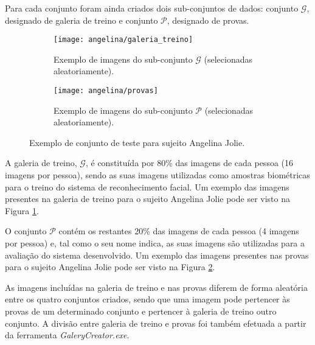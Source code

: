 Para cada conjunto foram ainda criados dois sub-conjuntos de dados: conjunto $\mathscr{G}$, designado de galeria de treino e conjunto $\mathscr{P}$, designado de provas.

\begin{figure}
	\begin{center}
        \begin{subfigure}[b]{0.9\textwidth}
                \centering
                \texttt{[image: angelina/galeria\_treino]}
                \caption{Exemplo de imagens do sub-conjunto $\mathscr{G}$ (selecionadas aleatoriamente).}
                \label{fig:galeria}
        \end{subfigure}%
     \end{center}
%

	\begin{center}
        \begin{subfigure}[b]{0.9\textwidth}
                \centering
                \texttt{[image: angelina/provas]}
                \caption{Exemplo de imagens do sub-conjunto $\mathscr{P}$ (selecionadas aleatoriamente).}
                \label{fig:provas}   
        \end{subfigure}
     \end{center}
    \caption{Exemplo de conjunto de teste para sujeito Angelina Jolie.}
     \label{fig:galeria_e_provas}        
\end{figure}

A galeria de treino, $\mathscr{G}$, é constituída por 80\% das imagens de cada pessoa (16 imagens por pessoa), sendo as suas imagens utilizadas como amostras biométricas para o treino do sistema de reconhecimento facial. Um exemplo das imagens presentes na galeria de treino para o sujeito Angelina Jolie pode ser visto na Figura \ref{fig:galeria}.

O conjunto $\mathscr{P}$ contém os restantes 20\% das imagens de cada pessoa (4 imagens por pessoa) e, tal como o seu nome indica, as suas imagens são utilizadas para a avaliação do sistema desenvolvido. Um exemplo das imagens presentes nas provas para o sujeito Angelina Jolie pode ser visto na Figura \ref{fig:provas}.

As imagens incluídas na galeria de treino e nas provas diferem de forma aleatória entre os quatro conjuntos criados, sendo que uma imagem pode pertencer às provas de um determinado conjunto e pertencer à galeria de treino outro conjunto.  A divisão entre galeria de treino e provas foi também efetuada a partir da ferramenta \textit{GaleryCreator.exe}.

